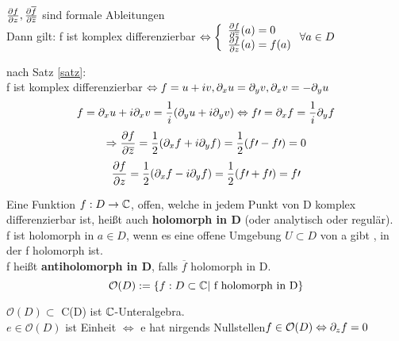 $\frac{\partial f}{\partial z},\frac{\partial \overline{f}}{\partial \overline{z}}$ sind formale Ableitungen\\
Dann gilt: f ist komplex differenzierbar $\Leftrightarrow \left\{
\begin{array}{ll}
\frac{\partial f}{\partial \overline{z}}(a) = 0\\
\frac{\partial f}{\partial z}(a) = f(a)
\end{array}\right. \forall a \in D $
\begin{bew}
	nach Satz \ref{satz}:\\
	f ist komplex differenzierbar $\Leftrightarrow f = u+iv, \partial_xu = \partial_yv,\partial_xv=-\partial_yu$\\
	\[f = \partial_xu +i\partial_xv=\frac{1}{i}(\partial_yu+i\partial_yv) \Leftrightarrow f\prime=\partial_xf=\frac{1}{i}\partial_yf\]
	\[\Rightarrow \frac{\partial f}{\partial \overline{z}}=\frac{1}{2} (\partial_xf+i\partial_yf)= \frac{1}{2} (f\prime - f\prime)=0\]
	\[\frac{\partial f}{\partial z}=\frac{1}{2} (\partial_xf-i\partial_yf)= \frac{1}{2} (f\prime + f\prime)=f\prime\]
\end{bew}

\begin{definition}
	Eine Funktion $f:D\to \mathbb{C}$, offen, welche in jedem Punkt von D komplex differenzierbar ist, heißt auch \textbf{holomorph in D} (oder analytisch oder regulär).\\
	f ist holomorph in $ a\in D$, wenn es eine offene Umgebung $ U \subset D$ von a gibt , in der f holomorph ist.\\
	f heißt \textbf{antiholomorph in D}, falls $\overline{f}$ holomorph in D.\\
	\[
	\mathcal{O}(D):= \{f: D\subset \mathbb{C}|\text{ f holomorph in D}\}
	\]
\end{definition}

\begin{bemerkung}
	$\mathcal{O}(D) \subset$ C(D) ist $\mathbb{C}$-Unteralgebra.\\
	$e \in \mathcal{O}(D)$ ist Einheit $\Leftrightarrow$ e hat nirgends Nullstellen$ f \in \mathcal{O}(D) \Leftrightarrow \partial_z f = 0$
\end{bemerkung}